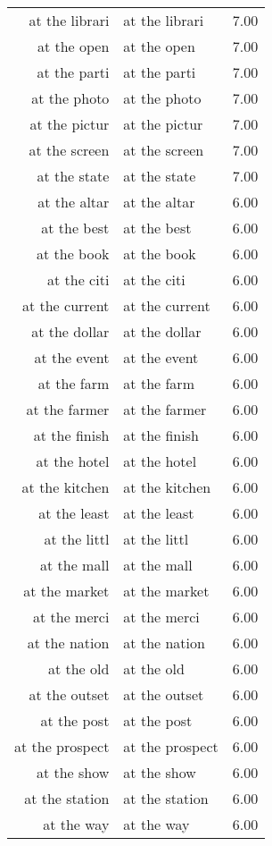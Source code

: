 \begin{table}[ht]
\begin{tabular}{rlr}
  at the librari & at the librari & 7.00 \\ 
  at the open & at the open & 7.00 \\ 
  at the parti & at the parti & 7.00 \\ 
  at the photo & at the photo & 7.00 \\ 
  at the pictur & at the pictur & 7.00 \\ 
  at the screen & at the screen & 7.00 \\ 
  at the state & at the state & 7.00 \\ 
  at the altar & at the altar & 6.00 \\ 
  at the best & at the best & 6.00 \\ 
  at the book & at the book & 6.00 \\ 
  at the citi & at the citi & 6.00 \\ 
  at the current & at the current & 6.00 \\ 
  at the dollar & at the dollar & 6.00 \\ 
  at the event & at the event & 6.00 \\ 
  at the farm & at the farm & 6.00 \\ 
  at the farmer & at the farmer & 6.00 \\ 
  at the finish & at the finish & 6.00 \\ 
  at the hotel & at the hotel & 6.00 \\ 
  at the kitchen & at the kitchen & 6.00 \\ 
  at the least & at the least & 6.00 \\ 
  at the littl & at the littl & 6.00 \\ 
  at the mall & at the mall & 6.00 \\ 
  at the market & at the market & 6.00 \\ 
  at the merci & at the merci & 6.00 \\ 
  at the nation & at the nation & 6.00 \\ 
  at the old & at the old & 6.00 \\ 
  at the outset & at the outset & 6.00 \\ 
  at the post & at the post & 6.00 \\ 
  at the prospect & at the prospect & 6.00 \\ 
  at the show & at the show & 6.00 \\ 
  at the station & at the station & 6.00 \\ 
  at the way & at the way & 6.00 \\ 

\end{tabular}
\end{table}
